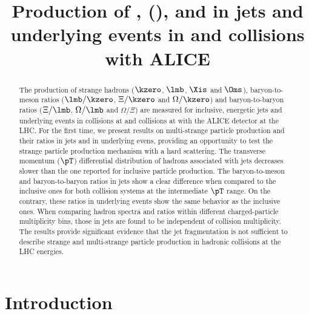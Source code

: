 \documentclass[ALICE,manyauthors]{cernphprep}
\begin{document}
\begin{titlepage}

\title{Production of \kzero, \lmb (\almb), \Xis and \Oms in jets and underlying events in \pp and \pPb collisions with ALICE}


\begin{abstract}
\label{sec:Abs}

The production of strange hadrons ($\kzero$, $\lmb$, $\Xis$ and $\Oms$), baryon-to-meson ratios ($\lmb/\kzero$, $\Xi/\kzero$ and $\Omega/\kzero$) and baryon-to-baryon ratios ($\Xi/\lmb$, $\Omega/\lmb$ and $\Omega/\Xi$) are measured for inclusive, energetic jets and underlying events in \pp collisions at \thirteen and \pPb collisions at \fivenn with the ALICE detector at the LHC.
For the first time, we present results on multi-strange particle production and their ratios in jets and in underlying evens, providing an opportunity to test the strange particle production mechanism with a hard scattering.
The transverse momentum ($\pT$) differential distribution of hadrons associated with jets decreases slower than the one reported for inclusive particle production.
The baryon-to-meson and baryon-to-baryon ratios in jets show a clear difference when compared to the inclusive ones for both collision systems at the intermediate $\pT$ range.
On the contrary, these ratios in underlying events show the same behavior as the inclusive ones.
When comparing hadron spectra and ratios within different charged-particle multiplicity bins, those in jets are found to be independent of collision multiplicity.
The results provide significant evidence that the jet fragmentation is not sufficient to describe strange and multi-strange particle production in hadronic collisions at the LHC energies. 


\end{abstract}

\end{titlepage}

\setcounter{page}{2}


\section{Introduction}%
\label{sec:Introduction}
\end{document}
